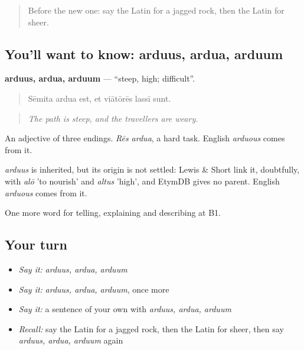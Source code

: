 \label{lesson:LA-C480-arduus}



\begin{quote}
Before the new one: say the Latin for a jagged rock, then the Latin for sheer.
\end{quote}

\subsection*{You'll want to know: arduus, ardua, arduum}
\textbf{arduus, ardua, arduum} — \textquotedblleft{}steep, high; difficult\textquotedblright{}.

\begin{quote}
Sēmita ardua est, et viātōrēs lassī sunt.
\end{quote}

\begin{quote}
\emph{The path is steep, and the travellers are weary.}
\end{quote}

An adjective of three endings. \emph{Rēs ardua}, a hard task. English \emph{arduous} comes from it.

\begin{cousinweb}
\emph{arduus} is inherited, but its origin is not settled: Lewis \& Short link it, doubtfully, with \emph{alō} 'to nourish' and \emph{altus} 'high', and EtymDB gives no parent. English \emph{arduous} comes from it.
\end{cousinweb}

\begin{grammarlens}[title={What you've built}]
One more word for telling, explaining and describing at B1.
\end{grammarlens}

\subsection*{Your turn}
\begin{itemize}
\raggedright
  \item \emph{Say it:} \emph{arduus, ardua, arduum}
  \item \emph{Say it:} \emph{arduus, ardua, arduum}, once more
  \item \emph{Say it:} a sentence of your own with \emph{arduus, ardua, arduum}
  \item \emph{Recall:} say the Latin for a jagged rock, then the Latin for sheer, then say \emph{arduus, ardua, arduum} again
\end{itemize}


